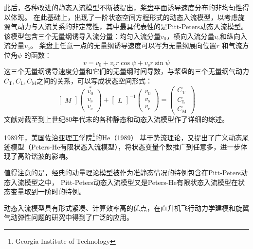 \documentclass[doctor,openright,twoside,color]{buaathesis}
\begin{document}
此后，各种改进的静态入流模型不断被提出，桨盘平面诱导速度分布的非均匀性得以体现。
在此基础上，出现了一阶状态空间方程形式的动态入流模型，以考虑旋翼气动力与入流关系的非定常性，其中最具代表性的是Pitt-Peters动态入流模型。
该模型包含三个无量纲诱导入流分量：均匀入流分量$v_{\mathrm{0}}$，横向入流分量$v_{\mathrm{s}}$和纵向入流分量$v_{\mathrm{c}}$。
桨盘上任意一点的无量纲诱导速度可以写为无量纲展向位置$r$ 和气流方位角$\psi$ 的函数：
\begin{equation}
v = v_0 + v_{\mathrm{c}} r \cos \psi + v_{\mathrm{s}} r \sin \psi
\end{equation}
这三个无量纲诱导速度分量和它们的无量纲时间导数，与桨盘的三个无量纲气动力$C_{ \mathrm{T} },C_{ \mathrm{L} },C_{ \mathrm{M} }$之间的关系，可以写成状态空间形式：
\begin{equation}
\begin{bmatrix} M \end{bmatrix}
\overset { * }{ \begin{pmatrix} v_{ \mathrm{0} } \\ v_{ \mathrm{s} } \\ v_{ \mathrm{c} } \end{pmatrix} }
+
\begin{bmatrix} L  \end{bmatrix}^ { -1}
\begin{pmatrix} v_{ \mathrm{0} } \\ v_{ \mathrm{s} } \\ v_{ \mathrm{c} } \end{pmatrix}
=
\begin{pmatrix} C_{ \mathrm{T} } \\ C_{ \mathrm{L} } \\ C_{ \mathrm{M} } \end{pmatrix}
\end{equation}
文献\cite{Chen1989}对截至到上世纪80年代末的各种静态和动态入流模型作了详细的综述。

1989年，美国佐治亚理工学院\footnote{Georgia Institute of Technology}的He（1989）
基于势流理论，又提出了广义动态尾迹模型（Peters-He有限状态入流模型），将状态变量个数推广到任意多，进一步体现了高阶谐波的影响。

值得注意的是，经典的动量理论模型被作为准静态情况的特例包含在Pitt-Peters动态入流模型之中，
Pitt-Peters动态入流模型又是Peters-He有限状态入流模型在状态变量取到一阶时的特例。

动态入流模型具有形式紧凑、计算效率高的优点，在直升机飞行动力学建模和旋翼气动弹性问题的研究中得到了广泛的应用。
\end{document}
